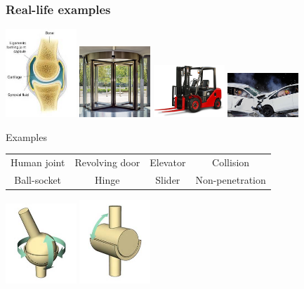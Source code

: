 \documentclass{beamer}
\begin{document}
\begin{frame}
\frametitle {Real-life examples}
\begin{center}
\includegraphics[width = 0.2\textwidth]{humanjoint.png}
\includegraphics[width = 0.2\textwidth]{door.png}
\includegraphics[width = 0.2\textwidth]{elevator.png}
\includegraphics[width = 0.2\textwidth]{carcrash.png}
   \begin{exampleblock}{Examples}
    \begin{center}
     \begin{tabular}{c c c c}
       Human joint & Revolving door & Elevator & Collision \\
       Ball-socket & Hinge & Slider & Non-penetration
     \end{tabular}
     \end{center}
   \end{exampleblock}
   \includegraphics[width = 0.2\textwidth]{ballsock.png}
   \includegraphics[width = 0.2\textwidth]{hinge.png}

\end{center}
\end{frame}
\end{document}
